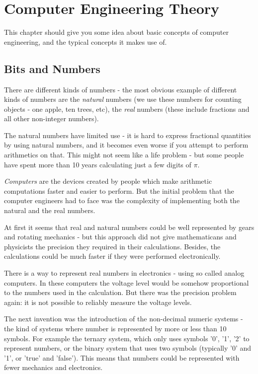 \chapter{Computer Engineering Theory}
This chapter should give you some idea about basic concepts of computer engineering, and the typical concepts it makes use of.







\section{Bits and Numbers}
There are different kinds of numbers - the most obvious example of different kinds of numbers are the \emph{natural} numbers (we use these numbers for counting objects - one apple, ten trees, etc), the \emph{real} numbers (these include fractions and all other non-integer numbers).

The natural numbers have limited use - it is hard to express fractional quantities by using natural numbers, and it becomes even worse if you attempt to perform arithmetics on that. This might not seem like a life problem - but some people have spent more than 10 years calculating just a few digits of $\pi$.

\emph{Computers} are the devices created by people which make arithmetic computations faster and easier to perform. But the initial problem that the computer engineers had to face was the complexity of implementing both the natural and the real numbers.

At first it seems that real and natural numbers could be well represented by gears and rotating mechanics - but this approach did not give mathematicans and physicists the precision they required in their calculations. Besides, the calculations could be much faster if they were performed electronically.

There is a way to represent real numbers in electronics - using so called analog computers. In these computers the voltage level would be somehow proportional to the numbers used in the calculation. But there was the precision problem again: it is not possible to reliably measure the voltage levels.

The next invention was the introduction of the non-decimal numeric systems - the kind of systems where number is represented by more or less than 10 symbols. For example the ternary system, which only uses symbols '0', '1', '2' to represent numbers, or the binary system that uses two symbols (typically '0' and '1', or 'true' and 'false'). This means that numbers could be represented with fewer mechanics and electronics.

